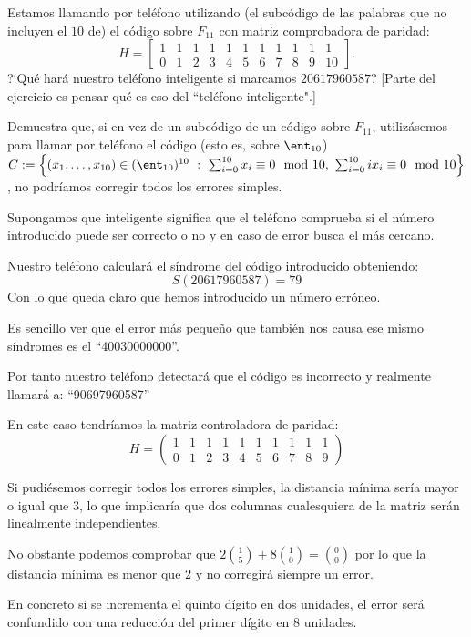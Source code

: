 \begin{problem}[3]
\ppart Estamos llamando por teléfono utilizando (el
subcódigo de las palabras que no incluyen el $10$ de) el código
sobre $ F_{11}$ con matriz comprobadora de paridad:
$$H=\left[\begin{array}{ccccccccccc}
1&1&1&1&1&1&1&1&1&1&1\\0&1&2&3&4&5&6&7&8&9&10
\end{array}\right].$$
?`Qué hará nuestro teléfono inteligente si marcamos $20617960587$?
[Parte del ejercicio es pensar qué es eso del ``teléfono
inteligente".]

\ppart Demuestra que, si en vez de un subcódigo de un código sobre
$ F_{11}$, utilizásemos para llamar por teléfono el código
 (esto es, sobre $\ent_{10}$)
$C:=\left\{(x_1,\dots,x_{10})\in(\ent_{10})^{10} \ : \
\sum_{i=0}^{10} x_i\equiv 0 \mod 10,\ \sum_{i=0}^{10} ix_i\equiv 0
\mod 10\right\}$, no podríamos corregir todos los errores
simples.

\solution


\spart

Supongamos que inteligente significa que el teléfono comprueba si el número introducido puede ser correcto o no y en caso de error busca el más cercano.

Nuestro teléfono calculará el síndrome del código introducido obteniendo:
\[S(20617960587)=79\]
Con lo que queda claro que hemos introducido un número erróneo.

Es sencillo ver que el error más pequeño que también nos causa ese mismo síndromes es el ``40030000000''.

Por tanto nuestro teléfono detectará que el código es incorrecto y realmente llamará a: ``90697960587''

\spart

En este caso tendríamos la matriz controladora de paridad:
\[H=\left(\begin{array}{cccccccccc}
1&1&1&1&1&1&1&1&1&1\\0&1&2&3&4&5&6&7&8&9
\end{array}\right)\]

Si pudiésemos corregir todos los errores simples, la distancia mínima sería mayor o igual que 3, lo que implicaría que dos columnas cualesquiera de la matriz serán linealmente independientes.

No obstante podemos comprobar que $2{1 \choose 5} + 8 { 1 \choose 0} = {0 \choose 0}$ por lo que la distancia mínima es menor que 2 y no corregirá siempre un error.

En concreto si se incrementa el quinto dígito en dos unidades, el error será confundido con una reducción del primer dígito en 8 unidades.

\end{problem}


